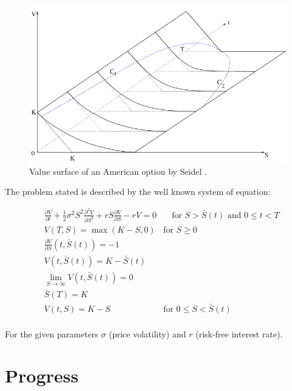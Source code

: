 \documentclass[a4paper,12pt]{article}
\begin{document}
  \begin{figure}[H]
    \centering
    \includegraphics[scale=0.7]{progress_report/American_put_option.png}
    \caption{Value surface of an American option by Seidel \cite{seydel_2009}.}
    \label{fig:value_surface}
  \end{figure}

  The problem stated is described by the well known system of equation:

  \begin{equation}
    \begin{aligned}
      & \frac{\partial V}{\partial t} + \frac{1}{2}\sigma^2 S^2 \frac{\partial^2 V}{\partial S^2} + rS \frac{\partial V}{\partial S} - rV = 0 & \quad \text{for $S > \bar{S}(t)$ and $0 \leq t < T$} \\
      & V(T, S) = \max(K - S, 0) & \text{for $S \geq 0$} \\
      & \frac{\partial V}{\partial S}(t, \bar{S}(t)) = -1 \\
      & V(t, \bar{S}(t)) = K - \bar{S}(t) \\
      & \lim_{S \rightarrow \infty} V(t, \bar{S}(t)) = 0 \\
      & \bar{S}(T) = K \\
      & V(t, S) = K - S & \text{for $0 \leq S < \bar{S}(t)$} \\
    \end{aligned}   
    \label{eq:section_1:free_boundary_problem}
  \end{equation}

  For the given parameters $\sigma$ (price volatility) 
  and $r$ (risk-free interest rate).
  
  \section{Progress}
\end{document}
